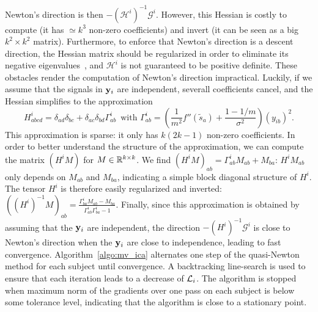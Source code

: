 \documentclass{report}
\begin{document}
{Newton's direction is then $-\left(\mathcal{H}^i\right)^{-1}\mathcal{G}^i$. However, this Hessian is costly to compute (it has $\simeq k^3$ non-zero coefficients) and invert (it can be seen as a big $k ^2\times k^2$ matrix). Furthermore, to enforce that Newton's direction is a descent direction, the Hessian matrix should be regularized in order to eliminate its negative eigenvalues~\cite{nocedal2006numerical}, and $\mathcal{H}^i$ is not guaranteed to be positive definite.
%
These obstacles render the computation of Newton's direction impractical.
%
Luckily, if we assume that the signals in $\mathbf{y}_i$ are independent, severall coefficients cancel, and the Hessian simplifies to the approximation
\begin{equation}
    \label{eq:hessian_approx}
    H^i_{abcd} = \delta_{ad}\delta_{bc} + \delta_{ac}\delta_{bd}\Gamma^i_{ab}\enspace \text{with  }\Gamma^i_{ab} = \left(\frac{1}{m^2}f''(\tilde{s}_a) + \frac{1 - 1/m}{\sigma^2}\right)\left(y_{ib}\right)^2.
\end{equation}
This approximation is sparse: it only has $k(2k -1)$ non-zero coefficients.
%
In order to better understand the structure of the approximation, we can compute the matrix $\left(H^iM\right)$ for $M\in \mathbb{R}^{k\times k}$. 
%
We find $\left(H^iM\right)_{ab} = \Gamma^i_{ab}M_{ab} + M_{ba}$: $H^iM_{ab}$ only depends on $M_{ab}$ and $M_{ba}$, indicating a simple block diagonal structure of $H^i$.
%
The tensor $H^i$ is therefore easily regularized and inverted:
$\left((H^i)^{-1}M\right)_{ab} = \frac{\Gamma^i_{ba}M_{ab} - M_{ba}}{\Gamma^i_{ab}\Gamma^i_{ba} - 1}$.
%
Finally, since this approximation is obtained by assuming that the $\mathbf{y}_i$ are independent, the direction $-\left(H^i\right)^{-1}\mathcal{G}^i$ is close to Newton's direction when the $\mathbf{y}_i$ are close to independence, leading to fast convergence.
%
Algorithm~\ref{algo:mv_ica} alternates one step of the quasi-Newton method for each subject until convergence.
%
A backtracking line-search is used to ensure that each iteration leads to a decrease of $\mathcal{L}_i$.
%
The algorithm is stopped when maximum norm of the gradients over one pass on each subject is below some tolerance level, indicating that the algorithm is close to a stationary point.

}
\end{document}
